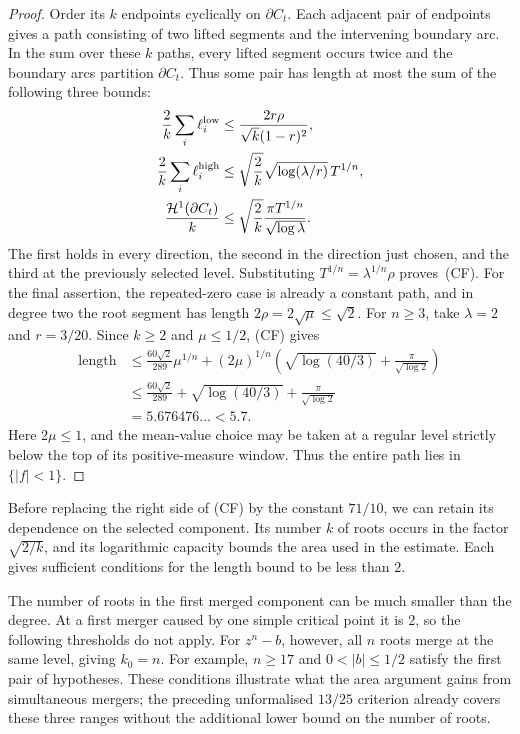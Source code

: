 \begin{proof}
Order its $k$ endpoints cyclically on $\partial C_t$. Each adjacent pair
of endpoints gives a path consisting of two lifted segments and the
intervening boundary arc. In the sum over these $k$ paths, every lifted
segment occurs twice and the boundary arcs partition $\partial C_t$.
Thus some pair has length at most the sum of the following three bounds:
\[
\begin{aligned}
 \frac2k\sum_i\ell_i^{\rm low}
 &\le\frac{2r\rho}{\sqrt{k}(1-r)^2},\\
 \frac2k\sum_i\ell_i^{\rm high}
 &\le\sqrt{\frac2k}\sqrt{\log(\lambda/r)}\,T^{1/n},\\
 \frac{\mathcal H^1(\partial C_t)}k
 &\le\sqrt{\frac2k}\frac{\pi T^{1/n}}{\sqrt{\log\lambda}}.
\end{aligned}
\]
The first holds in every direction, the second in the direction just
chosen, and the third at the previously selected level. Substituting
$T^{1/n}=\lambda^{1/n}\rho$ proves~(CF).
For the final assertion, the repeated-zero case is already a constant path,
and in degree two the root segment has length
$2\rho=2\sqrt\mu\le\sqrt2$.  For $n\ge3$, take $\lambda=2$ and $r=3/20$.
Since $k\ge2$ and $\mu\le1/2$, (CF) gives
\[
 \begin{aligned}
 \operatorname{length}
 &\le \frac{60\sqrt2}{289}\mu^{1/n}
 +(2\mu)^{1/n}\left(
   \sqrt{\log(40/3)}+\frac{\pi}{\sqrt{\log2}}
 \right)\\
 &\le \frac{60\sqrt2}{289}+\sqrt{\log(40/3)}
      +\frac{\pi}{\sqrt{\log2}}\\
 &=5.676476\ldots<5.7.
 \end{aligned}
\]
Here $2\mu\le1$, and the mean-value choice may be taken at a regular level
strictly below the top of its positive-measure window.  Thus the entire path
lies in $\{|f|<1\}$.
\end{proof}

Before replacing the right side of (CF) by the constant $71/10$, we can
retain its dependence on the selected component. Its number $k$ of
roots occurs in the factor $\sqrt{2/k}$, and its logarithmic capacity
bounds the area used in the estimate. Each gives sufficient conditions
for the length bound to be less than $2$.

The number of roots in the first merged component can be much smaller
than the degree. At a first merger caused by one simple critical point it
is $2$, so the following thresholds do not apply. For $z^n-b$, however,
all $n$ roots merge at the same level, giving $k_0=n$. For example,
$n\ge17$ and $0<|b|\le1/2$ satisfy the first pair of hypotheses. These
conditions illustrate what the area argument gains from simultaneous
mergers; the preceding unformalised $13/25$ criterion already covers these three ranges
without the additional lower bound on the number of roots.

